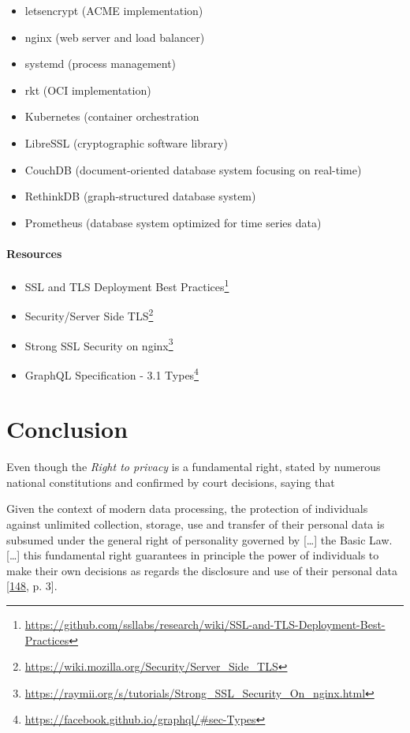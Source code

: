 \documentclass[12pt,english,a4paper,titlepage,cleardoublepage=empty,dottedtoc]{report}
\renewcommand{\href}[2]{#2\footnote{\url{#1}}}
\providecommand{\tightlist}{%
  \setlength{\itemsep}{0pt}\setlength{\parskip}{0pt}}
\let\origquote\quote
\let\endorigquote\endquote
\renewenvironment{quote}{%
    \origquote
    \itshape
}
{\endorigquote}
\begin{document}
\begin{itemize}
\tightlist
\item
  letsencrypt (ACME implementation)
\item
  nginx (web server and load balancer)
\item
  systemd (process management)
\item
  rkt (OCI implementation)
\item
  Kubernetes (container orchestration
\item
  LibreSSL (cryptographic software library)
\item
  CouchDB (document-oriented database system focusing on real-time)
\item
  RethinkDB (graph-structured database system)
\item
  Prometheus (database system optimized for time series data)
\end{itemize}

\subsubsection*{Resources}\label{resources}

\begin{itemize}
\tightlist
\item
  \href{https://github.com/ssllabs/research/wiki/SSL-and-TLS-Deployment-Best-Practices}{SSL
  and TLS Deployment Best Practices}
\item
  \href{https://wiki.mozilla.org/Security/Server_Side_TLS}{Security/Server
  Side TLS}
\item
  \href{https://raymii.org/s/tutorials/Strong_SSL_Security_On_nginx.html}{Strong
  SSL Security on nginx}
\item
  \href{https://facebook.github.io/graphql/\#sec-Types}{GraphQL
  Specification - 3.1 Types}
\end{itemize}

\chapter{Conclusion}\label{conclusion}

Even though the \emph{Right to privacy} is a fundamental right, stated
by numerous national constitutions and confirmed by court decisions,
saying that

\begin{quote}
Given the context of modern data processing, the protection of
individuals against unlimited collection, storage, use and transfer of
their personal data is subsumed under the general right of personality
governed by {[}\ldots{}{]} the Basic Law. {[}\ldots{}{]} this
fundamental right guarantees in principle the power of individuals to
make their own decisions as regards the disclosure and use of their
personal data
{[}\protect\hyperlink{ref-court-decision_1983_census-act-germany}{148},
p. 3{]}.
\end{quote}
\end{document}
